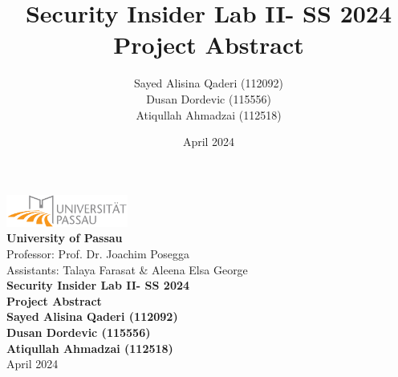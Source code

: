 \documentclass{article}
\title{Security Insider Lab II- SS 2024 \\ Project Abstract}
\author{Sayed Alisina Qaderi (112092) \\ Dusan Dordevic (115556) \\ Atiqullah Ahmadzai (112518)}
\date{April 2024}
\newcommand{\university}{\textbf{University of Passau}}
\newcommand{\professor}{Prof. Dr. Joachim Posegga}
\newcommand{\assistant}{Talaya Farasat \& Aleena Elsa George}
\begin{document}
\thispagestyle{empty} %

\begin{center}
    \includegraphics[width=0.3\textwidth]{pictures/uni-logo.png} \\ %
    \vspace{1cm}
    \university \\
    \vspace{0.5cm}
    Professor: \professor \\
    Assistants: \assistant \\
    \vspace{1.5cm}
    \textbf{\Huge Security Insider Lab II- SS 2024} \\
    \vspace{0.5cm}
    \textbf{\Large Project Abstract} \\
    \vspace{1cm}
    \textbf{Sayed Alisina Qaderi (112092)} \\
    \textbf{Dusan Dordevic (115556)} \\
    \textbf{Atiqullah Ahmadzai (112518)} \\
    \vspace{1cm}
    April 2024
\end{center}

\clearpage
\thispagestyle{empty} %

\clearpage


% 
% 
\end{document}
